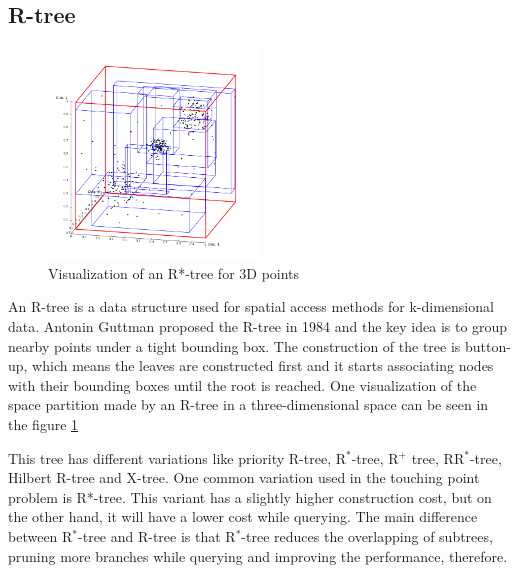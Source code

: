 \subsection{R-tree}
\begin{figure}
    \centering
    \includegraphics[width=0.5\textwidth]{figures/RTree-Visualization-3D.png}
    \caption{Visualization of an R*-tree for 3D points \cite{wiki:rtree}}
    \label{fig:rtree}
\end{figure}
An R-tree is a data structure used for spatial access methods for k-dimensional data. Antonin Guttman proposed the R-tree in 1984 \cite{10.1145/971697.602266} and the key idea is to group nearby points under a tight bounding box. The construction of the tree is button-up, which means the leaves are constructed first and it starts associating nodes with their bounding boxes until the root is reached. One visualization of the space partition made by an R-tree in a three-dimensional space can be seen in the figure \ref{fig:rtree}

This tree has different variations like priority R-tree, R$^*$-tree, R$^+$ tree, RR$^*$-tree, Hilbert R-tree and X-tree. One common variation used in the touching point problem is R*-tree. This variant has a slightly higher construction cost, but on the other hand, it will have a lower cost while querying. The main difference between R$^*$-tree and R-tree is that R$^*$-tree reduces the overlapping of subtrees, pruning more branches while querying and improving the performance, therefore. 

\pagebreak
